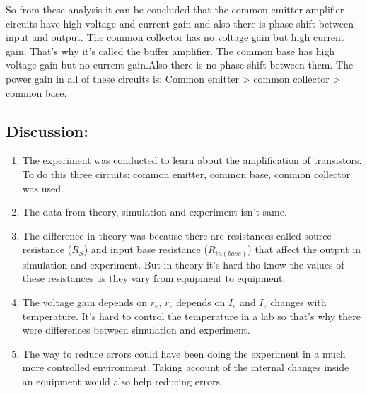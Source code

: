 \documentclass[a4paper, 12pt]{extarticle}
\begin{document}
\newpage
\restoregeometry
{}
So from these analysis it can be concluded that the common emitter amplifier circuits have high voltage and current gain and also there is phase shift between input and output.
The common collector has no voltage gain but high current gain. That's why it's called the buffer amplifier.
The common base has high voltage gain but no current gain.Also there is no phase shift between them.
The power gain in all of these circuits is: Common emitter > common collector > common base.
\subsection{Discussion:}
\begin{enumerate}
    \item The experiment was conducted to learn about the amplification of transistors. To do this three circuits: common emitter, common base, common collector was used.
    \item The data from theory, simulation and experiment isn't same.
    \item The difference in theory was because there are resistances called source resistance ($R_S$) and input base resistance ($R_{in(base)}$) that affect the output in simulation and experiment. But in theory it's hard tho know the values of these resistances as they vary from equipment to equipment.
    \item  The voltage gain depends on $r_e$, $r_e$ depends on $I_e$ and $I_e$ changes with temperature. It's hard to control the temperature in a lab so that's why there were differences between simulation and experiment.
    \item The way to reduce errors could have been doing the experiment in a much more controlled environment. Taking account of the internal changes inside an equipment would also help reducing errors.
\end{enumerate}
\end{document}
